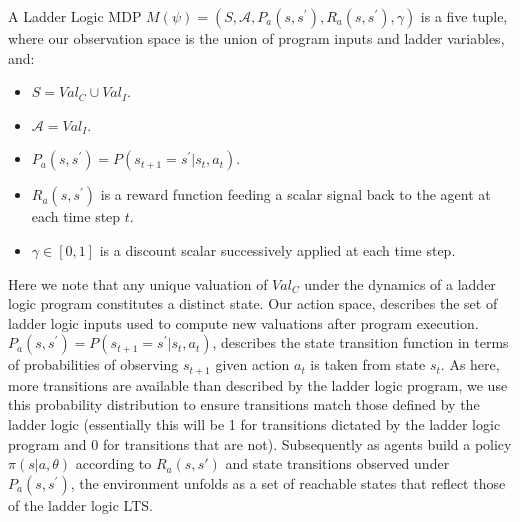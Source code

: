 \documentclass[runningheads]{llncs}
\begin{document}
\begin{definition}
	A Ladder Logic MDP $M(\psi) = (S,\mathcal{A},P_a(s,s^\prime), R_a(s,s^\prime),\gamma)$ is a five tuple, where our observation space is the union of program inputs and ladder variables, and:
\end{definition}
\begin{itemize}
	\item $S = Val_C \cup Val_I$.
	\item $\mathcal{A} = Val_I$.
	\item $P_a(s,s^\prime) = P(s_{t+1} = s^\prime | s_t, a_t)$.
	\item $R_a(s,s^\prime)$ is a reward function feeding a scalar signal back to the agent at each time step $t$. 
	\item $\gamma \in [0,1]$ is a discount scalar successively applied at each time step.
\end{itemize}

Here we note that any unique valuation of $Val_C$ under the dynamics of a ladder logic program constitutes a distinct state. Our action space, describes the set of ladder logic inputs used to compute new valuations after program execution. $P_a(s,s^\prime) = P(s_{t+1} = s^\prime | s_t, a_t)$, describes the state transition function in terms of probabilities of observing $s_{t+1}$ given action $a_t$ is taken from state $s_t$. As here, more transitions are available than described by the ladder logic program, we use this probability distribution to ensure transitions match those defined by the ladder logic (essentially this will be 1 for transitions dictated by the ladder logic program and 0 for transitions that are not). Subsequently as agents build a policy $\pi(s|a,\theta)$ according to $R_a(s,s')$ and state transitions observed under $P_a(s,s^\prime)$, the environment unfolds as a set of reachable states that reflect those of the ladder logic LTS. 
\end{document}
